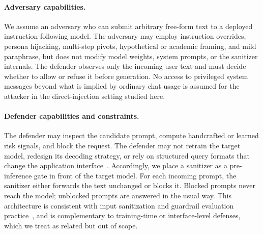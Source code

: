 ﻿\documentclass[10pt]{article}
\begin{document}
\paragraph{Adversary capabilities.}
We assume an adversary who can submit arbitrary free-form text to a deployed instruction-following model.
The adversary may employ instruction overrides, persona hijacking, multi-step pivots, hypothetical or academic framing, and mild paraphrase, but does not modify model weights, system prompts, or the sanitizer internals.
The defender observes only the incoming user text and must decide whether to allow or refuse it before generation.
No access to privileged system messages beyond what is implied by ordinary chat usage is assumed for the attacker in the direct-injection setting studied here.

\paragraph{Defender capabilities and constraints.}
The defender may inspect the candidate prompt, compute handcrafted or learned risk signals, and block the request.
The defender may not retrain the target model, redesign its decoding strategy, or rely on structured query formats that change the application interface~\cite{struq2024,secalign2024}.
Accordingly, we place a sanitizer as a pre-inference gate in front of the target model.
For each incoming prompt, the sanitizer either forwards the text unchanged or blocks it.
Blocked prompts never reach the model; unblocked prompts are answered in the usual way.
This architecture is consistent with input sanitization and guardrail evaluation practice~\cite{chowdhury2025prepsilonepsilonmptsanitizingsensitiveprompts,geng2025pisanitizer,shi2025promptarmor,zizzo2025adversarial}, and is complementary to training-time or interface-level defenses, which we treat as related but out of scope.
\end{document}
